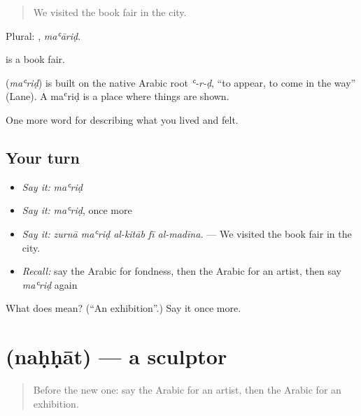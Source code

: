 \begin{quote}
We visited the book fair in the city.
\end{quote}

Plural: , \emph{maʿāriḍ}.

  is a book fair.

\begin{cousinweb}
\textbf{} (\emph{maʿriḍ}) is built on the native Arabic root \emph{ʿ-r-ḍ}, \textquotedblleft{}to appear, to come in the way\textquotedblright{} (Lane). A maʿriḍ is a place where things are shown.
\end{cousinweb}

\begin{grammarlens}[title={What you've built}]
One more word for describing what you lived and felt.
\end{grammarlens}

\subsection*{Your turn}
\begin{itemize}
\raggedright
  \item \emph{Say it:} \emph{maʿriḍ}
  \item \emph{Say it:} \emph{maʿriḍ}, once more
  \item \emph{Say it:} \emph{zurnā maʿriḍ al-kitāb fī al-madīna.} — We visited the book fair in the city.
  \item \emph{Recall:} say the Arabic for fondness, then the Arabic for an artist, then say \emph{maʿriḍ} again
\end{itemize}

\begin{tcolorbox}[breakable,colback=teal!4,colframe=teal!35!black,title={Before you move on}]
What does  mean? (\textquotedblleft{}An exhibition\textquotedblright{}.) Say it once more.
\end{tcolorbox}
\section[\texorpdfstring{\ar{نحات} (naḥḥāt)}{نحات (naḥḥāt)}]{ (naḥḥāt) — a sculptor}

\label{lesson:AR-C541-nahhat}



\begin{quote}
Before the new one: say the Arabic for an artist, then the Arabic for an exhibition.
\end{quote}

